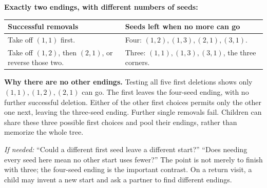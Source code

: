 \documentclass[11pt]{article}
\newcommand{\hint}[1]{\textit{If needed:} #1}
\begin{document}
\textbf{Exactly two endings, with different numbers of seeds:}
\begin{center}\renewcommand{\arraystretch}{1.2}
\begin{tabular}{p{.39\linewidth} p{.52\linewidth}}
Successful removals & Seeds left when no more can go\\\midrule
Take off $(1,1)$ first. & Four: $(1,2),(1,3),(2,1),(3,1)$.\\
Take off $(1,2)$, then $(2,1)$, or reverse those two. & Three: $(1,1),(1,3),(3,1)$, the three corners.
\end{tabular}\end{center}
\textbf{Why there are no other endings.} Testing all five first deletions shows only $(1,1),(1,2),(2,1)$ can go. The first leaves the four-seed ending, with no further successful deletion. Either of the other first choices permits only the other one next, leaving the three-seed ending. Further single removals fail. Children can share these three possible first choices and pool their endings, rather than memorize the whole tree.

\hint{``Could a different first seed leave a different start?'' ``Does needing every seed here mean no other start uses fewer?''} The point is not merely to finish with three; the four-seed ending is the important contrast. On a return visit, a child may invent a new start and ask a partner to find different endings.
\end{document}

